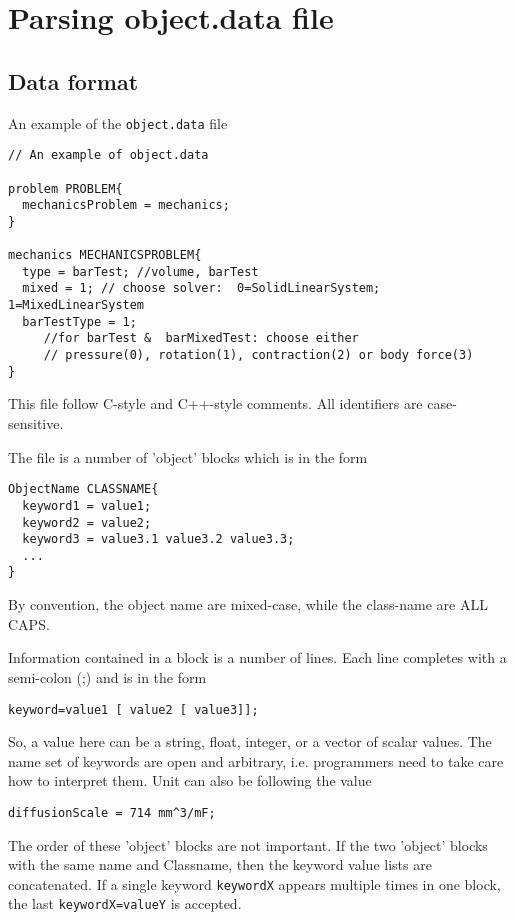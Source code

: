\section{Parsing object.data file}
\label{sec:object.data}
  
\subsection{Data format}

An example of the \verb!object.data! file
  {\small
  \begin{verbatim}
// An example of object.data
  
problem PROBLEM{
  mechanicsProblem = mechanics;
}
  
mechanics MECHANICSPROBLEM{
  type = barTest; //volume, barTest 
  mixed = 1; // choose solver:  0=SolidLinearSystem; 1=MixedLinearSystem 
  barTestType = 1; 
     //for barTest &  barMixedTest: choose either
     // pressure(0), rotation(1), contraction(2) or body force(3)
}
\end{verbatim} 
} 
This file follow C-style and C++-style comments. All identifiers are 
case-sensitive. 
  
The file is a number of 'object' blocks which is in the form
{\small \begin{verbatim}
ObjectName CLASSNAME{
  keyword1 = value1;
  keyword2 = value2;
  keyword3 = value3.1 value3.2 value3.3;
  ...
}
\end{verbatim}}
By convention, the object name are mixed-case, while the class-name are ALL
CAPS. 

Information contained in a block is a number of lines. Each line completes
with a semi-colon (;) and is in the form
\begin{verbatim}
keyword=value1 [ value2 [ value3]]; 
\end{verbatim}
So, a value here can be a string, float, integer, or a vector of scalar values.
The name set of keywords are open and arbitrary, i.e. programmers need to take
care how to interpret them. Unit can also be following the value
\begin{verbatim}
diffusionScale = 714 mm^3/mF;
\end{verbatim}

The order of these 'object' blocks are not important. If the two 'object' blocks
with the same name and Classname, then the keyword value lists are concatenated. If a
single keyword \verb!keywordX! appears multiple times in one block, the last
\verb!keywordX=valueY! is accepted.


